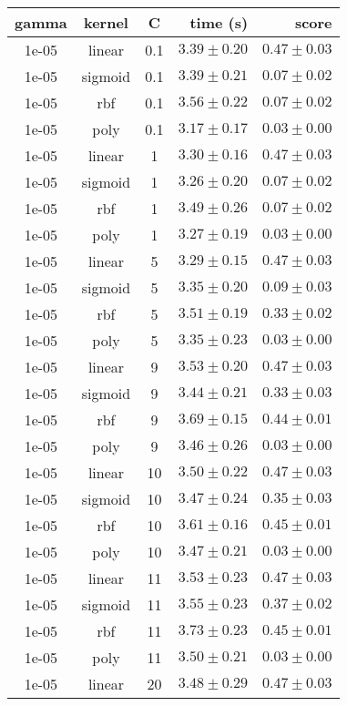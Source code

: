 \begin{tabular}{cccrr}
\toprule
\textbf{gamma} & \textbf{kernel} & \textbf{C} & \textbf{time (s)} & \textbf{score}\\
\midrule
1e-05 & linear & 0.1 & $3.39 \pm 0.20$ & $0.47 \pm 0.03$\\
1e-05 & sigmoid & 0.1 & $3.39 \pm 0.21$ & $0.07 \pm 0.02$\\
1e-05 & rbf & 0.1 & $3.56 \pm 0.22$ & $0.07 \pm 0.02$\\
1e-05 & poly & 0.1 & $3.17 \pm 0.17$ & $0.03 \pm 0.00$\\
1e-05 & linear & 1 & $3.30 \pm 0.16$ & $0.47 \pm 0.03$\\
1e-05 & sigmoid & 1 & $3.26 \pm 0.20$ & $0.07 \pm 0.02$\\
1e-05 & rbf & 1 & $3.49 \pm 0.26$ & $0.07 \pm 0.02$\\
1e-05 & poly & 1 & $3.27 \pm 0.19$ & $0.03 \pm 0.00$\\
1e-05 & linear & 5 & $3.29 \pm 0.15$ & $0.47 \pm 0.03$\\
1e-05 & sigmoid & 5 & $3.35 \pm 0.20$ & $0.09 \pm 0.03$\\
1e-05 & rbf & 5 & $3.51 \pm 0.19$ & $0.33 \pm 0.02$\\
1e-05 & poly & 5 & $3.35 \pm 0.23$ & $0.03 \pm 0.00$\\
1e-05 & linear & 9 & $3.53 \pm 0.20$ & $0.47 \pm 0.03$\\
1e-05 & sigmoid & 9 & $3.44 \pm 0.21$ & $0.33 \pm 0.03$\\
1e-05 & rbf & 9 & $3.69 \pm 0.15$ & $0.44 \pm 0.01$\\
1e-05 & poly & 9 & $3.46 \pm 0.26$ & $0.03 \pm 0.00$\\
1e-05 & linear & 10 & $3.50 \pm 0.22$ & $0.47 \pm 0.03$\\
1e-05 & sigmoid & 10 & $3.47 \pm 0.24$ & $0.35 \pm 0.03$\\
1e-05 & rbf & 10 & $3.61 \pm 0.16$ & $0.45 \pm 0.01$\\
1e-05 & poly & 10 & $3.47 \pm 0.21$ & $0.03 \pm 0.00$\\
1e-05 & linear & 11 & $3.53 \pm 0.23$ & $0.47 \pm 0.03$\\
1e-05 & sigmoid & 11 & $3.55 \pm 0.23$ & $0.37 \pm 0.02$\\
1e-05 & rbf & 11 & $3.73 \pm 0.23$ & $0.45 \pm 0.01$\\
1e-05 & poly & 11 & $3.50 \pm 0.21$ & $0.03 \pm 0.00$\\
1e-05 & linear & 20 & $3.48 \pm 0.29$ & $0.47 \pm 0.03$\\

\end{tabular}
